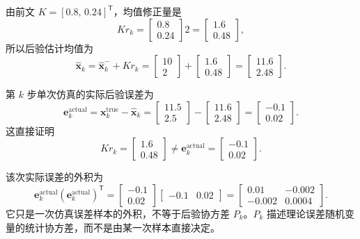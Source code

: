 \documentclass[UTF8,a4paper,11pt]{ctexart}
\newcommand{\prior}{^{-}}
\newcommand{\transpose}{^{\mathsf T}}
\begin{document}
由前文 $K=[0.8,\,0.24]\transpose$，均值修正量是
\begin{equation}
K r_k=
\begin{bmatrix}0.8\\0.24\end{bmatrix}2
=\begin{bmatrix}1.6\\0.48\end{bmatrix},
\end{equation}
所以后验估计均值为
\begin{equation}
\hat{\bm x}_k
=\hat{\bm x}_k\prior+K r_k
=\begin{bmatrix}10\\2\end{bmatrix}
+\begin{bmatrix}1.6\\0.48\end{bmatrix}
=\begin{bmatrix}11.6\\2.48\end{bmatrix}.
\end{equation}

第 $k$ 步单次仿真的实际后验误差为
\begin{equation}
\boxed{\bm e_k^{\mathrm{actual}}
=\bm x_k^{\mathrm{true}}-\hat{\bm x}_k}
=\begin{bmatrix}11.5\\2.5\end{bmatrix}
-\begin{bmatrix}11.6\\2.48\end{bmatrix}
=\begin{bmatrix}-0.1\\0.02\end{bmatrix}.
\end{equation}
这直接证明
\begin{equation}
K r_k=\begin{bmatrix}1.6\\0.48\end{bmatrix}
\neq
\bm e_k^{\mathrm{actual}}=\begin{bmatrix}-0.1\\0.02\end{bmatrix}.
\end{equation}

该次实际误差的外积为
\begin{equation}
\boxed{\bm e_k^{\mathrm{actual}}\left(\bm e_k^{\mathrm{actual}}\right)\transpose}
=\begin{bmatrix}-0.1\\0.02\end{bmatrix}
\begin{bmatrix}-0.1&0.02\end{bmatrix}
=\begin{bmatrix}0.01&-0.002\\-0.002&0.0004\end{bmatrix}.
\end{equation}
它只是一次仿真误差样本的外积，不等于后验协方差 $P_k$。$P_k$ 描述理论误差随机变量的统计协方差，而不是由某一次样本直接决定。
\end{document}
